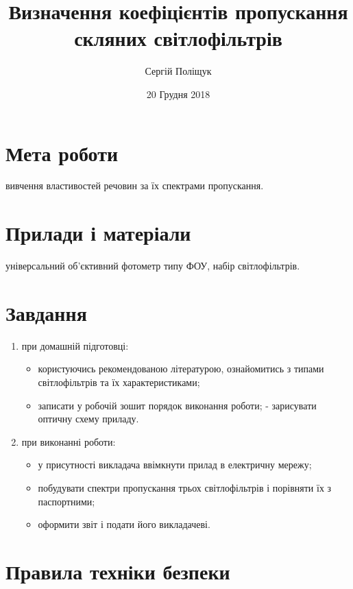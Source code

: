 \documentclass[onecolumn]{el-author}
\date{20 Грудня 2018}
\begin{document}
\title{Визначення коефіцієнтів пропускання скляних світлофільтрів}

\author{Сергій Поліщук}

\maketitle

\section{Мета роботи}

вивчення властивостей речовин за їх спектрами пропускання.

\section{Прилади і матеріали}

універсальний об'єктивний фотометр типу ФОУ, набір світлофільтрів.

\section{Завдання}

\begin{enumerate}
	\item при домашній підготовці:
	\begin{itemize}
		\item  користуючись рекомендованою літературою, ознайомитись з
типами світлофільтрів та їх характеристиками;
		\item записати у робочій зошит порядок виконання роботи;
-  зарисувати оптичну схему приладу.
	\end{itemize}
	\item при виконанні роботи:
	\begin{itemize}
		\item  у присутності викладача ввімкнути прилад в електричну
мережу;
		\item  побудувати спектри пропускання трьох світлофільтрів і
порівняти їх з паспортними;
		\item  оформити звіт і подати його викладачеві.
	\end{itemize}
\end{enumerate}

\section{Правила техніки безпеки}
\end{document}
